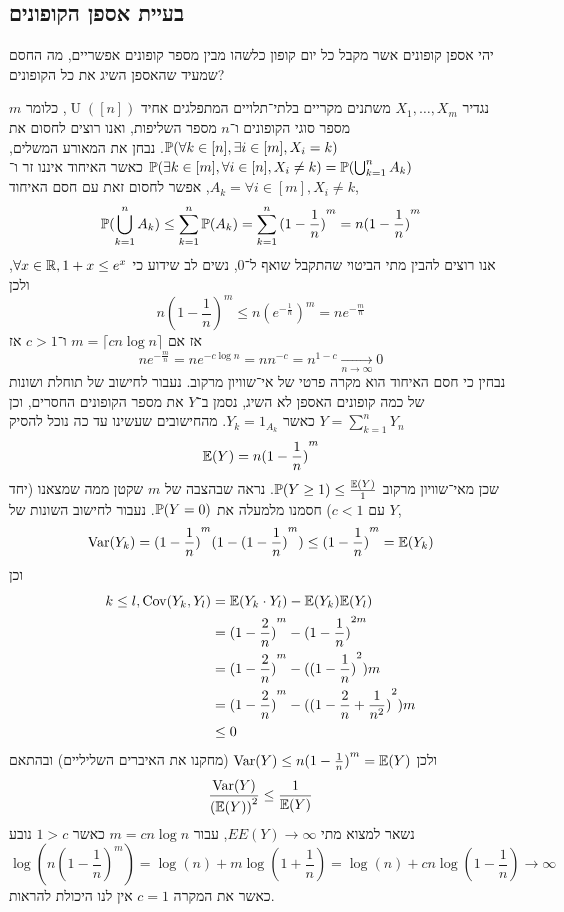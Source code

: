 \subsection{בעיית אספן הקופונים}
\begin{exercise}
	יהי אספן קופונים אשר מקבל כל יום קופון כלשהו מבין מספר קופונים אפשריים, מה החסם שמעיד שהאספן השיג את כל הקופונים? 
\end{exercise}
\begin{solution}
	נגדיר $X_1, \dots, X_m$ משתנים מקריים בלתי־תלויים המתפלגים אחיד $\operatorname{U}([n])$, כלומר $m$ מספר סוגי הקופונים ו־$n$ מספר השליפות, ואנו רוצים לחסום את $\mathbb{P}(\forall k \in [n], \exists i \in [m], X_i = k)$.
	נבחן את המאורע המשלים, $\mathbb{P}(\exists k \in [m], \forall i \in [n], X_i \ne k) = \mathbb{P}(\bigcup_{k = 1}^n A_k)$ כאשר האיחוד איננו זר ו־$A_k = \forall i \in [m], X_i \ne k$, אפשר לחסום זאת עם חסם האיחוד,
	\[
		\mathbb{P}(\bigcup_{k = 1}^n A_k)
		\le \sum_{k = 1}^{n} \mathbb{P}(A_k)
		= \sum_{k = 1}^{n} {(1 - \frac{1}{n})}^m
		= n {(1 - \frac{1}{n})}^m
	\]
	אנו רוצים להבין מתי הביטוי שהתקבל שואף ל־$0$, נשים לב שידוע כי $\forall x \in \mathbb{R}, 1 + x \le e^x$, ולכן
	\[
		n {(1 - \frac{1}{n})}^m
		\le n {(e^{-\frac{1}{n}})}^m
		= n e^{-\frac{m}{n}}
	\]
	אז אם $m = \lceil cn \log n \rceil$ ו־$c > 1$ אז
	\[
		n e^{-\frac{m}{n}}
		= n e^{-c \log n}
		= n n^{-c}
		= n^{1 - c}
		\xrightarrow[n \to \infty]{} 0
	\]
	נבחין כי חסם האיחוד הוא מקרה פרטי של אי־שוויון מרקוב.
	נעבור לחישוב של תוחלת ושונות של כמה קופונים האספן לא השיג,
	נסמן ב־$Y$ את מספר הקופונים החסרים, וכן $Y = \sum_{k = 1}^{n} Y_n$ כאשר $Y_k = 1_{A_k}$.
	מהחישובים שעשינו עד כה נוכל להסיק
	\[
		\mathbb{E}(Y) = n {(1 - \frac{1}{n})}^m
	\]
	שכן מאי־שוויון מרקוב $\mathbb{P}(Y \ge 1) \le \frac{\mathbb{E}(Y)}{1}$.
	נראה שבהצבה של $m$ שקטן ממה שמצאנו (יחד עם $c < 1$) חסמנו מלמעלה את $\mathbb{P}(Y = 0)$. נעבור לחישוב השונות של $Y$,
	\[
		\operatorname{Var}(Y_k)
		= {(1 - \frac{1}{n})}^m (1 - {(1 - \frac{1}{n})}^m)
		\le {(1 - \frac{1}{n})}^m
		= \mathbb{E}(Y_k)
	\]
	וכן
	\begin{align*}
		k \le l,
		\operatorname{Cov}(Y_k, Y_l)
		& = \mathbb{E}(Y_k \cdot Y_l) - \mathbb{E}(Y_k) \mathbb{E}(Y_l) \\
		& = {(1 - \frac{2}{n})}^m - {(1 - \frac{1}{n})}^{2m} \\
		& = {(1 - \frac{2}{n})}^m - {({(1 - \frac{1}{n})}^{2})}m \\
		& = {(1 - \frac{2}{n})}^m - {({(1 - \frac{2}{n} + \frac{1}{n^2})}^{2})}m \\
		& \le 0
	\end{align*}
	ולכן $\operatorname{Var}(Y) \le n {(1 - \frac{1}{n})}^m = \mathbb{E}(Y)$ (מחקנו את האיברים השליליים) ובהתאם
	\[
		\frac{\operatorname{Var}(Y)}{{(\mathbb{E}(Y))}^2}
		\le \frac{1}{\mathbb{E}(Y)}
	\]
	נשאר למצוא מתי $EE(Y) \to \infty$,
	עבור $m = cn \log n$ כאשר $1 > c$ נובע
	\[
		\log(n {(1 - \frac{1}{n})}^m)
		= \log(n) + m \log(1 + \frac{1}{n})
		= \log(n) + cn \log(1 - \frac{1}{n}) \to \infty
	\]
	כאשר את המקרה $c = 1$ אין לנו היכולת להראות.
\end{solution}


